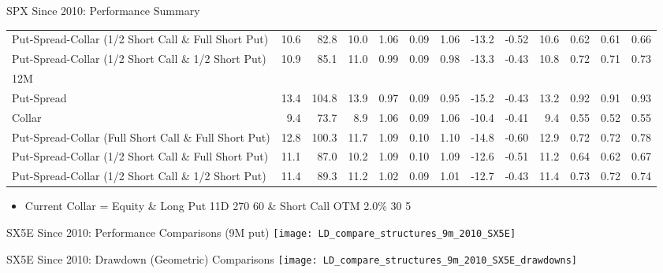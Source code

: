 \documentclass{beamer}
\begin{document}
\begin{frame}{SPX Since 2010: Performance Summary}
{\begin{tabular}{lrrrrrrrrrrrr}
Put-Spread-Collar (1/2 Short Call \& Full Short Put) & 10.6 & 82.8 & 10.0 & 1.06 & 0.09 & 1.06 & -13.2 & -0.52 & 10.6 & 0.62 & 0.61 & 0.66\\
Put-Spread-Collar (1/2 Short Call \& 1/2 Short Put) & 10.9 & 85.1 & 11.0 & 0.99 & 0.09 & 0.98 & -13.3 & -0.43 & 10.8 & 0.72 & 0.71 & 0.73\\
\midrule
12M \\
\midrule
Put-Spread & 13.4 & 104.8 & 13.9 & 0.97 & 0.09 & 0.95 & -15.2 & -0.43 & 13.2 & 0.92 & 0.91 & 0.93\\
Collar & 9.4 & 73.7 & 8.9 & 1.06 & 0.09 & 1.06 & -10.4 & -0.41 & 9.4 & 0.55 & 0.52 & 0.55\\
Put-Spread-Collar (Full Short Call \& Full Short Put) & 12.8 & 100.3 & 11.7 & 1.09 & 0.10 & 1.10 & -14.8 & -0.60 & 12.9 & 0.72 & 0.72 & 0.78\\
Put-Spread-Collar (1/2 Short Call \& Full Short Put) & 11.1 & 87.0 & 10.2 & 1.09 & 0.10 & 1.09 & -12.6 & -0.51 & 11.2 & 0.64 & 0.62 & 0.67\\
Put-Spread-Collar (1/2 Short Call \& 1/2 Short Put) & 11.4 & 89.3 & 11.2 & 1.02 & 0.09 & 1.01 & -12.7 & -0.43 & 11.4 & 0.73 & 0.72 & 0.74\\
\midrule
\bottomrule
\end{tabular}

}
\begin{itemize}
\item {\footnotesize Current Collar = Equity \& Long Put 11D 270 60 \& Short Call OTM 2.0\% 30 5}
\end{itemize}
\end{frame}

\begin{frame}{SX5E Since 2010: Performance Comparisons (9M put)}
\texttt{[image: LD\_compare\_structures\_9m\_2010\_SX5E]}
\end{frame}

\begin{frame}{SX5E Since 2010: Drawdown (Geometric) Comparisons}
\texttt{[image: LD\_compare\_structures\_9m\_2010\_SX5E\_drawdowns]}
\end{frame}
\end{document}
